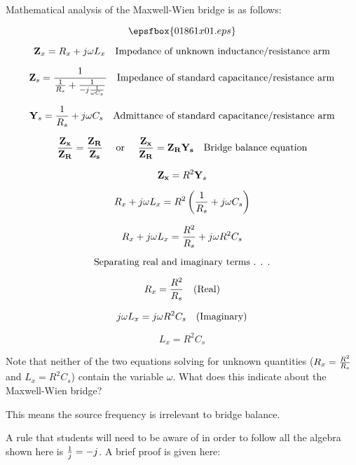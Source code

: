 

Mathematical analysis of the Maxwell-Wien bridge is as follows:

$$\epsfbox{01861x01.eps}$$

$${\bf Z}_x = R_x + j\omega L_x \hskip 10pt \hbox{Impedance of unknown inductance/resistance arm}$$

$${\bf Z}_s = {1 \over {{1 \over R_s} + {1 \over -j{1 \over \omega C_s}}}} \hskip 10pt \hbox{Impedance of standard capacitance/resistance arm}$$

$${\bf Y}_s = {1 \over R_s} + j\omega C_s \hskip 10pt \hbox{Admittance of standard capacitance/resistance arm}$$

$${{\bf Z_x} \over {\bf Z_R}} = {{\bf Z_R} \over {\bf Z_s}} \hskip 10pt \hbox{ or } \hskip 10pt {{\bf Z_x} \over {\bf Z_R}} = {{\bf Z_R}{\bf Y_s}} \hskip 10pt \hbox{Bridge balance equation}$$

$${\bf Z_x} = R^2 {\bf Y}_s$$

$$R_x + j\omega L_x = R^2 \left( {1 \over R_s} + j\omega C_s \right)$$

$$R_x + j\omega L_x = {R^2 \over R_s} + j\omega R^2 C_s$$

$$\hbox{Separating real and imaginary terms . . .}$$

$$R_x = {R^2 \over R_s} \hskip 10pt \hbox{(Real)}$$

$$j\omega L_x = j\omega R^2 C_s  \hskip 10pt \hbox{(Imaginary)}$$

$$L_x = R^2 C_s$$

Note that neither of the two equations solving for unknown quantities ($R_x = {R^2 \over R_s}$ and $L_x = R^2 C_s$) contain the variable $\omega$.  What does this indicate about the Maxwell-Wien bridge?







This means the source frequency is irrelevant to bridge balance.







A rule that students will need to be aware of in order to follow all the algebra shown here is ${1 \over j} = -j$.  A brief proof is given here:

